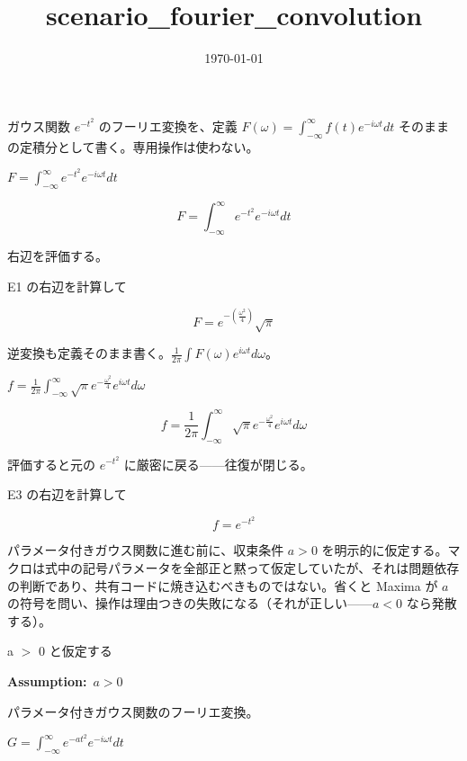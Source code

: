 \documentclass[dvipdfmx,a4paper,11pt]{jsarticle}
\title{scenario\_fourier\_convolution}
\date{\today}
\begin{document}
\maketitle

ガウス関数 $e^{-t^2}$ のフーリエ変換を、定義 $F(\omega)=\int_{-\infty}^{\infty} f(t)e^{-i\omega t}dt$ そのままの定積分として書く。専用操作は使わない。

$F = \int_{-\infty}^{\infty} e^{-t^2} e^{-i \omega t} dt$

\begin{equation}
  F = \int_{-\infty}^{\infty} e^{-t^2} e^{-i \omega t} dt
  \label{eq:E1}
\end{equation}

右辺を評価する。

E1 の右辺を計算して

\begin{equation}
  F = e^ {- \left(\frac{\omega^2}{4}\right) } \sqrt{\pi}
  \label{eq:E2}
\end{equation}

逆変換も定義そのまま書く。$\frac{1}{2\pi}\int F(\omega)e^{i\omega t}d\omega$。

$f = \frac{1}{2\pi}\int_{-\infty}^{\infty} \sqrt{\pi} e^{-\frac{\omega^2}{4}} e^{i \omega t} d\omega$

\begin{equation}
  f = \frac{1}{2\pi}\int_{-\infty}^{\infty} \sqrt{\pi} e^{-\frac{\omega^2}{4}} e^{i \omega t} d\omega
  \label{eq:E3}
\end{equation}

評価すると元の $e^{-t^2}$ に厳密に戻る——往復が閉じる。

E3 の右辺を計算して

\begin{equation}
  f = e^ {- t^2 }
  \label{eq:E4}
\end{equation}

パラメータ付きガウス関数に進む前に、収束条件 $a>0$ を明示的に仮定する。マクロは式中の記号パラメータを全部正と黙って仮定していたが、それは問題依存の判断であり、共有コードに焼き込むべきものではない。省くと Maxima が $a$ の符号を問い、操作は理由つきの失敗になる（それが正しい——$a<0$ なら発散する）。

a $>$ 0 と仮定する

\noindent\textbf{Assumption:}\ $\displaystyle a > 0$\par

パラメータ付きガウス関数のフーリエ変換。

$G = \int_{-\infty}^{\infty} e^{-a t^2} e^{-i \omega t} dt$
\end{document}
